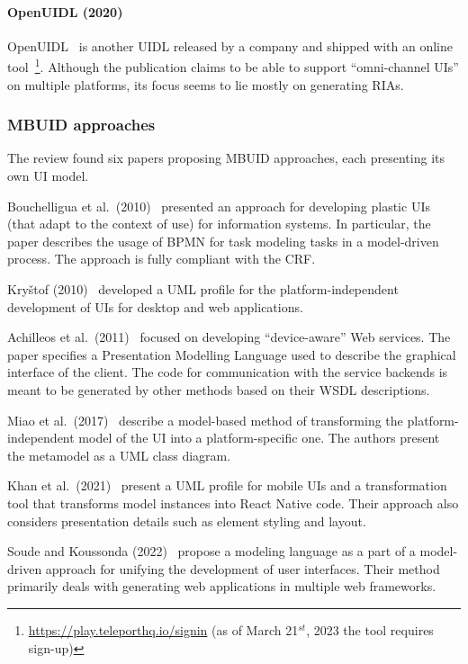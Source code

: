 \paragraph{OpenUIDL (2020)}
OpenUIDL~\cite{Moldovan2020} is another UIDL released by a company and shipped with an online tool~\footnote{\url{https://play.teleporthq.io/signin} (as of March 21$^{st}$, 2023 the tool requires sign-up)}.
Although the publication claims to be able to support \enquote{omni-channel UIs} on multiple platforms, its focus seems to lie mostly on generating RIAs.

\subsubsection{MBUID approaches}

The review found six papers proposing MBUID approaches, each presenting its own UI model.

Bouchelligua et al.\ (2010)~\cite{Bouchelligua2010} presented an approach for developing plastic UIs (that adapt to the context of use) for information systems.
In particular, the paper describes the usage of BPMN for task modeling tasks in a model-driven process.
The approach is fully compliant with the CRF\@.

Kryštof (2010)~\cite{kryvstof2010lpgm} developed a UML profile for the platform-independent development of UIs for desktop and web applications.

Achilleos et al.\ (2011)~\cite{Achilleos2011} focused on developing \enquote{device-aware} Web services.
The paper specifies a Presentation Modelling Language used to describe the graphical interface of the client.
The code for communication with the service backends is meant to be generated by other methods based on their WSDL descriptions.

Miao et al.\ (2017)~\cite{Miao2017} describe a model-based method of transforming the platform-independent model of the UI into a platform-specific one.
The authors present the metamodel as a UML class diagram.

Khan et al.\ (2021)~\cite{Khan2021} present a UML profile for mobile UIs and a transformation tool that transforms model instances into React Native code.
Their approach also considers presentation details such as element styling and layout.

Soude and Koussonda (2022)~\cite{Soude2022} propose a modeling language as a part of a model-driven approach for unifying the development of user interfaces.
Their method primarily deals with generating web applications in multiple web frameworks.

